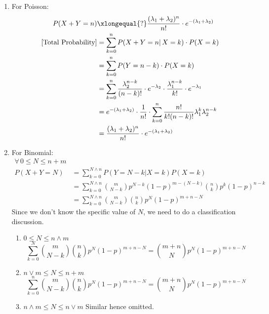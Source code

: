 \documentclass{article}
\begin{document}
\begin{enumerate}
    \item For Poisson:
    \begin{align*}
    P(X+Y=n) &\xlongequal{?} \frac{(\lambda_{1}+\lambda_{2})^{n}}{n!} \cdot e^{-(\lambda_{1}+\lambda_{2})}\\
    [\text{Total Probability}] &= \sum_{k=0}^{n} P(X+Y = n |\,X=k) \cdot P(X=k)\\
                               &= \sum_{k=0}^{n} P(Y=n-k) \cdot P(X=k) \\
                               &= \sum_{k=0}^{n} \frac{\lambda_{2}^{n-k}}{(n-k)!} \cdot e^{-\lambda_{2}} \cdot \frac{\lambda_{1}^{n-k}}{k!} \cdot e^{-\lambda_{1}}\\
                               &= e^{-(\lambda_{1} + \lambda_{2})} \cdot \frac{1}{n!} \cdot \sum_{k=0}^{n} \frac{n!}{k!(n-k)!} \lambda_{1}^{k} \lambda_{2}^{n-k}\\
                               &= \frac{(\lambda_{1}+\lambda_{2})^{n}}{n!} \cdot e^{-(\lambda_{1}+\lambda_{2})}
    \end{align*}
    \item For Binomial:
    \begin{align*}
        \forall\, 0 \leq N \leq n+m &\\
        P(X + Y = N) &= \sum^{N \land n}_{k = 0}P(Y = N-k | X = k)P(X = k) \\
                     &= \sum^{N \land n}_{k = 0} \binom{m}{N-k}p^{N-k}(1-p)^{m -(N-k)} \binom{n}{k}p^k(1-p)^{n-k} \\
                     &= \sum^{N \land n}_{k = 0} \binom{m}{N - k}\binom{n}{k}p^{N}(1-p)^{m+n - N}
    \end{align*}
    Since we don't know the specific value of $N$, we need to do a classification discussion.
    \begin{enumerate}
    \item $0\leq N \leq n\wedge m$
          \[\sum_{k=0}^{N} \binom{m}{N-k} \binom{n}{k} p^{N} (1-p)^{m+n-N} = \binom{m+n}{N} p^{N} (1-p)^{m+n-N}\]
    \item $n\vee m \leq N \leq n+m$
          \[\sum_{k=0}^{n} \binom{m}{N-k} \binom{n}{k} p^{N} (1-p)^{m+n-N} = \binom{m+n}{N} p^{N} (1-p)^{m+n-N}\]
    \item $n\wedge m \leq N \leq n\vee m$
          Similar hence omitted.
\end{enumerate}
\end{enumerate}
\end{document}
